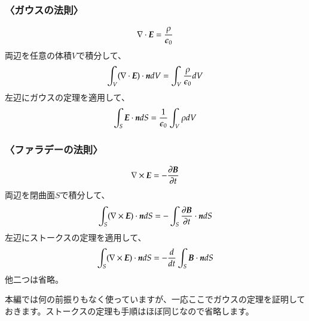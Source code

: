 \documentclass[10pt,b5paper,papersize,dvipdfmx]{jsbook}
\begin{document}
\subsubsection{〈ガウスの法則〉}
\begin{align}
  \nabla\cdot\vb*{E} = \frac{\rho}{\epsilon_0}
\end{align}
両辺を任意の体積$V$で積分して、
\begin{align}
  \int_V (\nabla\cdot\vb*{E})\cdot\vb*{n} dV = \int_V \frac{\rho}{\epsilon_0}dV
\end{align}
左辺にガウスの定理を適用して、
\begin{align}
  \int_S \vb*{E}\cdot \vb*{n} dS = \frac{1}{\epsilon_0} \int_V \rho dV
\end{align}

\subsubsection{〈ファラデーの法則〉}
\begin{align}
\nabla\times\vb*{E} = -\frac{\partial\vb*{B}}{\partial t}
\end{align}
両辺を閉曲面$S$で積分して、
\begin{align}
  \int_S (\nabla\times\vb*{E})\cdot\vb*{n} dS
  = -\int_S \frac{\partial\vb*{B}}{\partial t}\cdot\vb*{n} dS
\end{align}
左辺にストークスの定理を適用して、
\begin{align}
  \int_S (\nabla\times\vb*{E})\cdot\vb*{n} dS
  = -\frac{d}{dt} \int_S \vb*{B}\cdot\vb*{n} dS
\end{align}
他二つは省略。
\par

本編では何の前振りもなく使っていますが、一応ここでガウスの定理を証明しておきます。ストークスの定理も手順はほぼ同じなので省略します。
\end{document}
